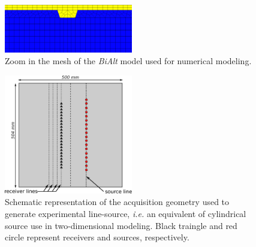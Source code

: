 \documentclass[manuscript,revised]{geophysics}
\newcommand{\bialt}{\textit{BiAlt} }
\begin{document}
\begin{figure}[!h]
	\centering
	\includegraphics[width=0.5\textwidth]{fig/bialt-mesh.eps}
	\caption{Zoom in the mesh of the \bialt model used for numerical modeling.}
	\label{panel_bialt_mesh}
\end{figure}

\begin{figure}[!h]
	\centering
	\includegraphics[width=0.5\textwidth]{fig/amplitude_acqui_principle.eps}
	\caption{Schematic representation of the acquisition geometry used to generate experimental line-source, \textit{i.e.} an equivalent of cylindrical source use in two-dimensional modeling. Black traingle and red circle represent receivers and sources, respectively.}
	\label{amplitude_acqui_principle}
\end{figure}
\end{document}

